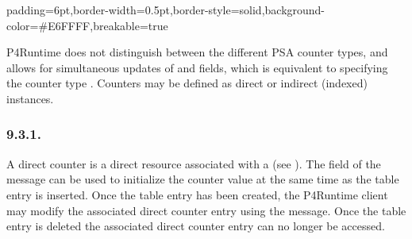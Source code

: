 \documentclass[11pt]{article}
\begin{document}
{%
\begin{mdbmargintb}{6pt}{6pt}%
\begin{mdblock}{padding=6pt,border-width=0.5pt,border-style=solid,background-color=\#E6FFFF,breakable=true}%
\begin{mdpre}%
\end{mdpre}%
\end{mdblock}%
\end{mdbmargintb}%

\noindent{}P4Runtime does not distinguish between the different PSA counter types, and
allows for simultaneous updates of  and  fields, which
is equivalent to specifying the counter type . Counters may
be defined as direct or indirect (indexed) instances.%

\subsubsection{9.3.1.\hspace*{0.5em}}\label{sec-directcounterentry}%

\noindent{}A direct counter is a direct resource associated with a  (see
). The  field of the
 message can be used to initialize the counter value at the same
time as the table entry is inserted. Once the table entry has been created, the
P4Runtime client may modify the associated direct counter entry using the
 message. Once the table entry is deleted the associated
direct counter entry can no longer be accessed.%

}
\end{document}
